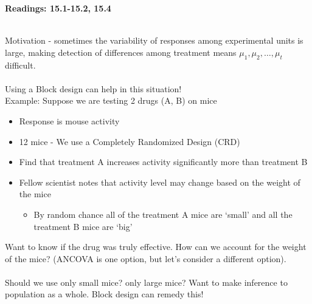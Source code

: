 \begin{center}\large\textbf{Readings: 15.1-15.2, 15.4}\\
\normalsize \end{center}
\large ~\hrulefill
~\\

Motivation - sometimes the variability of responses among experimental units is large, making detection of differences among treatment means $\mu_1,\mu_2,\ldots,\mu_t$ difficult.\\~\\
Using a Block design can help in this situation!\\

Example:  Suppose we are testing 2 drugs (A, B) on mice
\begin{itemize}
        \item{Response is mouse activity}
        \item{12 mice - We use a Completely Randomized Design (CRD)}
        \item{Find that treatment A increases activity significantly more than treatment B}
        \item{Fellow scientist notes that activity level may change based on the weight of the mice}
    \begin{itemize}
            \item{By random chance all of the treatment A mice are `small' and all the treatment B mice are `big'}
     \end{itemize}
\end{itemize}

Want to know if the drug was truly effective.  How can we account for the weight of the mice?  (ANCOVA is one option, but let's consider a different option).\\~\\
Should we use only small mice? only large mice?  Want to make inference to population as a whole.  Block design can remedy this!\\~\\

\newpage

